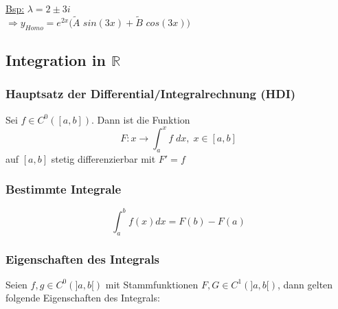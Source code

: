 \documentclass[6pt]{article}
\begin{document}
\begin{multicols*}{3}
	\underline{Bsp:} $\lambda = 2 \pm 3i$ \\
	$\Rightarrow y_{Homo} = e^{2x}(\tilde{A}$ $sin(3x) + \tilde{B}$ $cos(3x) )$
	
	
	\vspace{40mm} 
	
	




\pagebreak
\subsection*{Integration in $\mathbb{R}$} 

	\subsubsection*{Hauptsatz der Differential/Integralrechnung (HDI)}
		Sei $f \in C^0([a,b])$. Dann ist die Funktion
		\[
			F: x \to \int_a^x f \; dx, \; x \in [a,b]
		\]
		auf $[a,b]$ stetig differenzierbar mit  $F' = f$
		
	\subsubsection*{Bestimmte Integrale}
	\[
		\int_{a}^{b} f(x)  dx = F(b) - F(a)
 	\]	
		
	\subsubsection*{Eigenschaften des Integrals}
		Seien $f,g \in C^0(]a,b[)$ mit Stammfunktionen $F,G \in C^1(]a,b[)$, dann gelten folgende Eigenschaften des Integrals: \vspace{-1mm} \\
		

\end{multicols*}
\end{document}
